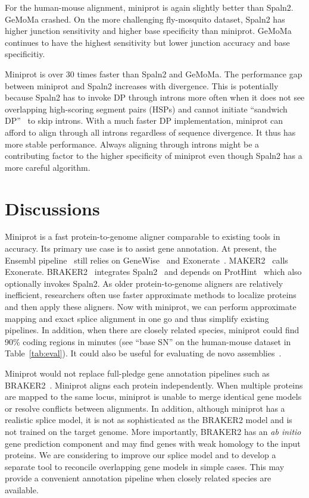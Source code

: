 \documentclass{bioinfo}
\begin{document}
For the human-mouse alignment, miniprot is again slightly better than Spaln2.
GeMoMa crashed. On the more challenging fly-mosquito dataset, Spaln2 has
higher junction sensitivity and higher base specificity than miniprot. GeMoMa
continues to have the highest sensitivity but lower junction accuracy and base
specificitiy.

Miniprot is over 30 times faster than Spaln2 and GeMoMa. The performance gap between miniprot and Spaln2
increases with divergence. This is potentially because Spaln2 has to invoke DP
through introns more often when it does not see overlapping high-scoring
segment pairs (HSPs) and cannot initiate ``sandwich DP''~\citep{Wu:2005vn} to
skip introns. With a much faster DP implementation, miniprot can afford to
align through all introns regardless of sequence divergence. It thus has more
stable performance. Always aligning through introns might be a contributing
factor to the higher specificity of miniprot even though Spaln2 has a more
careful algorithm.

\section{Discussions}

Miniprot is a fast protein-to-genome aligner comparable to existing tools in
accuracy. Its primary use case is to assist gene annotation. At present, the
Ensembl pipeline~\citep{Aken:2016wr} still relies on
GeneWise~\citep{Birney:2004uy} and Exonerate~\citep{Slater:2005aa}.
MAKER2~\citep{Cantarel:2008ue,Holt:2011tt} calls Exonerate.
BRAKER2~\citep{Bruna:2021ug} integrates Spaln2~\citep{Iwata:2012aa} and
depends on ProtHint~\citep{Bruna:2020vy} which also optionally invokes Spaln2.
As older protein-to-genome aligners are relatively inefficient, researchers
often use faster approximate methods to localize proteins and then apply these
aligners. Now with miniprot, we can perform approximate mapping and exact
splice alignment in one go and thus simplify existing pipelines. In addition,
when there are closely related species, miniprot could find 90\% coding regions
in minutes (see ``base SN'' on the human-mouse dataset in Table~\ref{tab:eval}).
It could also be useful for evaluating de novo assemblies~\citep{Manni:2021ww}.

Miniprot would not replace full-pledge gene
annotation pipelines such as BRAKER2~\citep{Bruna:2021ug}.  Miniprot aligns
each protein independently. When multiple proteins are mapped to the same
locus, miniprot is unable to merge identical gene models or resolve conflicts
between alignments. In addition, although miniprot has a realistic splice
model, it is not as sophisticated as the BRAKER2 model and is not trained on
the target genome. More importantly, BRAKER2 has an \emph{ab initio} gene
prediction component and may find genes with weak homology to the input
proteins. We are considering to improve our splice model and to develop a
separate tool to reconcile overlapping gene models in simple cases. This may
provide a convenient annotation pipeline when closely related species are
available.
\end{document}
